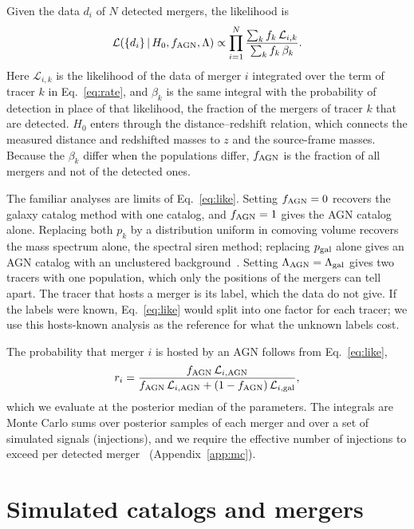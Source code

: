 \documentclass[aps,prd,reprint,amsmath,amssymb,nofootinbib]{revtex4-2}
\newcommand{\fAGN}{f_{\rm AGN}}
\begin{document}
Given the data $d_i$ of $N$ detected mergers, the likelihood is~\cite{Mandel:2018mve}
\begin{equation}
\mathcal{L}(\{d_i\}\,|\,H_0,\fAGN,\Lambda)\propto\prod_{i=1}^{N}\frac{\sum_k f_k\,\mathcal{L}_{i,k}}{\sum_k f_k\,\beta_k}.
\label{eq:like}
\end{equation}
Here $\mathcal{L}_{i,k}$ is the likelihood of the data of merger $i$ integrated over the term of tracer $k$ in Eq.~\eqref{eq:rate}, and $\beta_k$ is the same integral with the probability of detection in place of that likelihood, the fraction of the mergers of tracer $k$ that are detected.
$H_0$ enters through the distance--redshift relation, which connects the measured distance and redshifted masses to $z$ and the source-frame masses.
Because the $\beta_k$ differ when the populations differ, $\fAGN$ is the fraction of all mergers and not of the detected ones.

The familiar analyses are limits of Eq.~\eqref{eq:like}.
Setting $\fAGN=0$ recovers the galaxy catalog method with one catalog, and $\fAGN=1$ gives the AGN catalog alone.
Replacing both $p_k$ by a distribution uniform in comoving volume recovers the mass spectrum alone, the spectral siren method; replacing $p_{\rm gal}$ alone gives an AGN catalog with an unclustered background~\cite{Bom:2023zgw,Pouw:2026lar}.
Setting $\Lambda_{\rm AGN}=\Lambda_{\rm gal}$ gives two tracers with one population, which only the positions of the mergers can tell apart.
The tracer that hosts a merger is its label, which the data do not give.
If the labels were known, Eq.~\eqref{eq:like} would split into one factor for each tracer; we use this hosts-known analysis as the reference for what the unknown labels cost.

The probability that merger $i$ is hosted by an AGN follows from Eq.~\eqref{eq:like},
\begin{equation}
r_i=\frac{\fAGN\,\mathcal{L}_{i,{\rm AGN}}}{\fAGN\,\mathcal{L}_{i,{\rm AGN}}+(1-\fAGN)\,\mathcal{L}_{i,{\rm gal}}},
\label{eq:member}
\end{equation}
which we evaluate at the posterior median of the parameters.
The integrals are Monte Carlo sums over posterior samples of each merger and over a set of simulated signals (injections), and we require the effective number of injections to exceed \NeffFactor{} per detected merger~\cite{Farr:2019rap} (Appendix~\ref{app:mc}).

\section{Simulated catalogs and mergers}
\label{sec:data}
\end{document}
